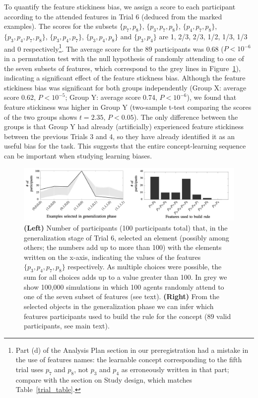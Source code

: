 To quantify the feature stickiness bias, we assign a score to each participant according to the attended features in Trial 6 (deduced from the marked examples). The scores for the subsets $\{p_7,p_8\}$, $\{p_3,p_7,p_8\}$, $\{p_4,p_7,p_8\}$, $\{p_3,p_4,p_7,p_8\}$, $\{p_3,p_4,p_7\}$, $\{p_3,p_4,p_8\}$ and $\{p_3,p_4\}$ are 1, 2/3, 2/3, 1/2, 1/3, 1/3 and 0 respectively\footnote{Part (d) of the Analysis Plan section in our preregistration had a mistake in the use of features names: the learnable concept corresponding to the fifth trial uses $p_7$ and $p_8$, not $p_3$ and $p_4$ as erroneously written in that part; compare with the section on Study design, which matches Table~\ref{trial_table}.}. The average score for the 89 participants was 0.68 ($P<10^{-6}$ in a permutation test with the null hypothesis of randomly attending to one of the seven subsets of features, which correspond to the grey lines in Figure~\ref{fig:results1}), indicating a significant effect of the feature stickness bias. Although the feature stickiness bias was significant for both groups independently (Group X: average score 0.62, $P<10^{-5}$;  Group Y: average score 0.74, $P<10^{-6}$), we found that feature stickiness was higher in Group Y (two-sample t-test comparing the scores of the two groups shows $t=2.35$,  $P<0.05$). The only difference between the groups is that Group Y had already (artificially) experienced feature stickiness between the previous Trials 3 and 4, so they have already identified it as an useful bias for the task. This suggests that the entire concept-learning sequence can be important when studying learning biases. %

\begin{figure}
\begin{center}
	\includegraphics[scale=.37]{papers/images_behavior_research_methods/results_1.png}
\end{center}\caption{\textbf{(Left)} Number of participants (100 participants total) that, in the generalization stage of Trial 6, selected an element (possibly among others; the numbers add up to more than 100) with the elements written on the x-axis, indicating the values of the features $\{p_3,p_4,p_7,p_8\}$ respectively. As multiple choices were possible, the sum for all choices adds up to a value greater than 100. In grey we show 100,000 simulations in which 100 agents randomly attend to one of the seven subset of features (see text). \textbf{(Right)} From the selected objects in the generalization phase we can infer which features participants used to build the rule for the concept (89 valid participants, see main text).}
\label{fig:results1}
\end{figure}

